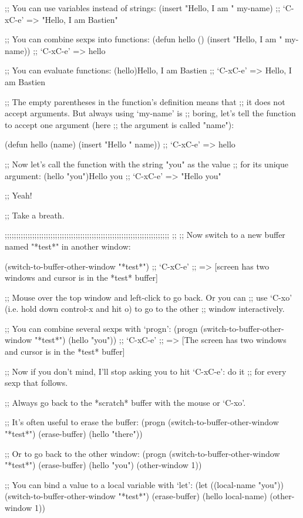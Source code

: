 ;; You can use variables instead of strings:
(insert "Hello, I am " my-name)
;; `C-xC-e' => "Hello, I am Bastien"

;; You can combine sexps into functions:
(defun hello () (insert "Hello, I am " my-name))
;; `C-xC-e' => hello

;; You can evaluate functions:
(hello)Hello, I am Bastien
;; `C-xC-e' => Hello, I am Bastien

;; The empty parentheses in the function's definition means that
;; it does not accept arguments.  But always using `my-name' is
;; boring, let's tell the function to accept one argument (here
;; the argument is called "name"):

(defun hello (name) (insert "Hello " name))
;; `C-xC-e' => hello

;; Now let's call the function with the string "you" as the value
;; for its unique argument:
(hello "you")Hello you
;; `C-xC-e' => "Hello you"

;; Yeah!

;; Take a breath.

;;;;;;;;;;;;;;;;;;;;;;;;;;;;;;;;;;;;;;;;;;;;;;;;;;;;;;;;;;;;;;;;;;;;;;;;
;;
;; Now switch to a new buffer named "*test*" in another window:

(switch-to-buffer-other-window "*test*")
;; `C-xC-e'
;; => [screen has two windows and cursor is in the *test* buffer]

;; Mouse over the top window and left-click to go back.  Or you can
;; use `C-xo' (i.e. hold down control-x and hit o) to go to the other
;; window interactively.

;; You can combine several sexps with `progn':
(progn
  (switch-to-buffer-other-window "*test*")
  (hello "you"))
;; `C-xC-e'
;; => [The screen has two windows and cursor is in the *test* buffer]

;; Now if you don't mind, I'll stop asking you to hit `C-xC-e': do it
;; for every sexp that follows.

;; Always go back to the *scratch* buffer with the mouse or `C-xo'.

;; It's often useful to erase the buffer:
(progn
  (switch-to-buffer-other-window "*test*")
  (erase-buffer)
  (hello "there"))

;; Or to go back to the other window:
(progn
  (switch-to-buffer-other-window "*test*")
  (erase-buffer)
  (hello "you")
  (other-window 1))

;; You can bind a value to a local variable with `let':
(let ((local-name "you"))
  (switch-to-buffer-other-window "*test*")
  (erase-buffer)
  (hello local-name)
  (other-window 1))

